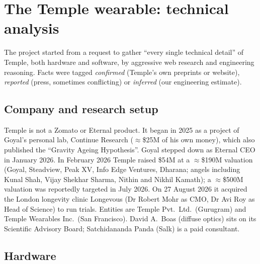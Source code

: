 \section{The Temple wearable: technical analysis}
\label{sec:temple}

The project started from a request to gather ``every single technical detail'' of Temple, both hardware and software, by aggressive web research and engineering reasoning. Facts were tagged \emph{confirmed} (Temple's own preprints or website), \emph{reported} (press, sometimes conflicting) or \emph{inferred} (our engineering estimate).

\subsection{Company and research setup}

Temple is not a Zomato or Eternal product. It began in 2025 as a project of Goyal's personal lab, Continue Research ($\approx$\$25M of his own money), which also published the ``Gravity Ageing Hypothesis''. Goyal stepped down as Eternal CEO in January 2026. In February 2026 Temple raised \$54M at a $\approx$\$190M valuation (Goyal, Steadview, Peak XV, Info Edge Ventures, Dharana; angels including Kunal Shah, Vijay Shekhar Sharma, Nithin and Nikhil Kamath); a $\approx$\$500M valuation was reportedly targeted in July 2026. On 27 August 2026 it acquired the London longevity clinic Longevous (Dr Robert Mohr as CMO, Dr Avi Roy as Head of Science) to run trials. Entities are Temple Pvt.\ Ltd.\ (Gurugram) and Temple Wearables Inc.\ (San Francisco). David A.\ Boas (diffuse optics) sits on its Scientific Advisory Board; Satchidananda Panda (Salk) is a paid consultant.

\subsection{Hardware}

